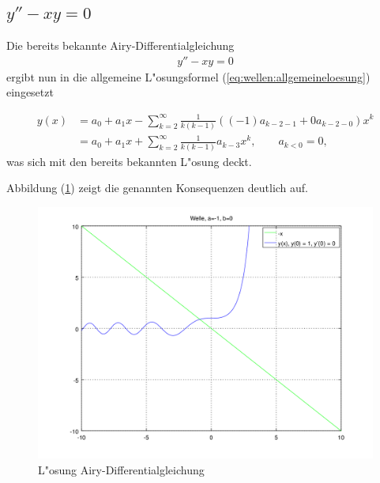\subsection{\texorpdfstring{$y''-xy = 0$}{y''-xy = 0}}
Die bereits bekannte Airy-Differentialgleichung
\begin{align*}
	y''-xy = 0
\end{align*}
ergibt nun in die allgemeine L"osungsformel (\ref{eq:wellen:allgemeineloesung}) 
eingesetzt

\begin{equation*}
	\begin{split}
		y(x) &= a_0+a_1x-\sum_{k=2}^{\infty} \frac{1}{k(k-1)} ((-1) a_{k-2-1} + 
		0 
		a_{k-2-0}) x^k
		\\
		&= a_0+a_1x+\sum_{k=2}^{\infty} \frac{1}{k(k-1)} a_{k-3} x^k,
		\qquad a_{k < 0} = 0,
	\end{split}
\end{equation*}
was sich mit den bereits bekannten L"osung deckt.

Abbildung (\ref{fig:wellen:airy-dgl}) zeigt die genannten Konsequenzen deutlich 
auf.

\begin{figure}
	\includegraphics[scale=0.65]{./wellen/images/allgemein/n1.png}
	\caption{L"osung Airy-Differentialgleichung}
	\label{fig:wellen:airy-dgl}
\end{figure}